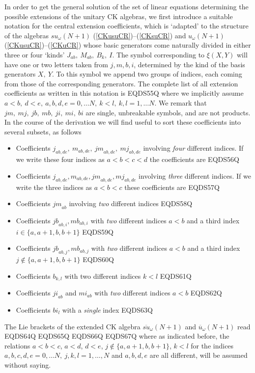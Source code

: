 \documentclass[12pt]{article}
\begin{document}
In order to get the general solution of the set of linear equations
determining the possible extensions of the  unitary CK
algebras, we first introduce a suitable notation for the central
extension coefficients, which is `adapted' to the structure of the
algebras $su_{\omega}(N+1)$  (\ref{CKusuCR})--(\ref{CKsuCR})  and
$u_{\omega}(N+1)$ (\ref{CKusuCR})--(\ref{CKuCR})
whose basic generators come  naturally divided in either three
or four `kinds' ${J}_{ab},\ {M}_{ab},\ {B}_{k},\ {I}$. The symbol
corresponding to ${\xi}(X, Y)$ will have one or two letters taken
from $j, m, b, i$, determined by the kind of the basis generators $X,\
Y$. To this symbol we append two groups of indices, each coming from
those of the corresponding generators.  The complete list of all
extension coefficients as written in this notation is
EQDS55Q
where we implicitly assume $a<b,\ d<e,\ a,b,d,e=0, \dots N, \ k<l,
\ k, l=1, \dots N$. We remark that ${jm},\ {mj},\ {jb},\ {mb},\ {ji},\ {mi},\
{bi}$ are single, unbreakable symbols, and are not products. In the
course of the derivation we will find useful to sort these
coefficients into several subsets, as follows

\begin{itemize}
\item Coefficients
${j}_{ab,de},\ {m}_{ab,de},\ {jm}_{ab,de},\ {mj}_{ab,de}$
involving \emph{four} different indices. If we write these four indices
as $a<b<c<d$ the coefficients are
EQDS56Q
\item Coefficients
${j}_{ab,de}, {m}_{ab,de}, {jm}_{ab,de}, {mj}_{ab,de}$ involving
\emph{three} different indices. If we write the three indices as
$a<b<c$ these coefficients are
EQDS57Q
\item Coefficients ${jm}_{ab}$
involving \emph{two} different indices
EQDS58Q
\item Coefficients ${jb}_{ab, i}, {mb}_{ab, i}$ with \emph{two}
different indices $a<b$ and a third index $i \in \{a,a+1,b,b+1\}$
EQDS59Q
\item Coefficients ${jb}_{ab, j}, {mb}_{ab, j}$ with \emph{two}
different indices $a<b$ and a third index $j \notin \{a,a+1,b,b+1\}$
EQDS60Q
\item Coefficients ${b}_{k,l}$ with two different indices $k<l$
EQDS61Q
\item Coefficients ${ji}_{ab}$ and ${mi}_{ab}$ with \emph{two}
different indices $a<b$
EQDS62Q
\item Coefficients ${bi}_{l}$ with a \emph{single} index
EQDS63Q
\end{itemize}
The Lie brackets of the extended CK algebra
$\overline{su}_{\omega}(N+1)$  and
$\overline{u}_{\omega}(N+1)$   read
EQDS64Q
EQDS65Q
EQDS66Q
EQDS67Q
where as indicated before, the relations $a<b<c$, $a<d$, $d<e$,   $j
\notin\{a,a+1,b,b+1\}$,
$k<l$ for the indices $a,b,c,d,e=0, \dots N, \ j,k,l=1,\dots, N$
and $a, b, d, e$ are all different, will be assumed without saying.
\end{document}
